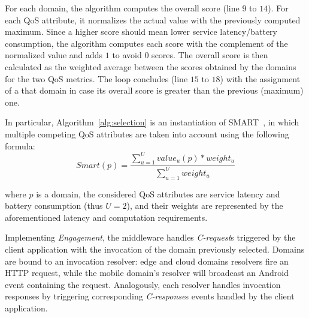 For each domain, the algorithm computes the overall score (line $9$ to $14$). For each QoS attribute, it normalizes the actual value with the previously computed maximum.
Since a higher score should mean lower service latency/battery consumption, the algorithm computes each score with the complement of the normalized value and adds $1$ to avoid $0$ scores. 
The overall score is then calculated as the weighted average between the scores obtained by the domains for the two QoS metrics. The loop concludes (line $15$ to $18$) with the assignment of a that domain in case its overall score is greater than the previous (maximum) one.  

In particular,
Algorithm~\ref{alg:selection} is an instantiation of SMART~\cite{Olson1996}, in which multiple competing QoS attributes are taken into account using the following formula:
{\small
\begin{equation}
Smart(p) = \frac{\sum_{u=1}^{U} value_{u}(p)*weight_u}{\sum_{u=1}^{U}weight_u} \label{eq:smart}
\end{equation}
}%

\noindent
where $p$ is a domain, the considered QoS attributes are service latency and battery consumption (thus $U = 2$), and their weights are represented by the aforementioned latency and computation requirements. %


Implementing \textit{Engagement}, the middleware handles \textit{C-request}s triggered by the client application 
with the invocation of the domain previously selected. Domains are bound to an invocation resolver: edge and cloud domains resolvers fire an HTTP request, while the mobile domain's resolver will broadcast an Android event containing the request. Analogously, each resolver handles invocation responses by triggering corresponding \textit{C-response}s events handled by the client application.